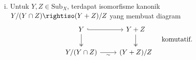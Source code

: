 \begin{teorema}
\begin{enumerate}[(i)]
		komutatif. Selain itu,
		$\overline{Y_1\cap Y_2}=\overline{Y_1}\cap\overline{Y_2}$ dan
		$\overline{Y_1+Y_2}=\overline{Y_1}+\overline{Y_2}$.
		\item Untuk $Y,Z\in\mathrm{Sub}_X$, terdapat isomorfisme kanonik
		$Y/(Y\cap Z)\rightiso(Y+Z)/Z$ yang membuat diagram
		\[\begin{tikzcd}
			Y \arrow[hookrightarrow, r] \arrow[twoheadrightarrow, d] & Y+Z \arrow[twoheadrightarrow, d] \\
			Y/(Y \cap Z) \arrow[r, "\sim"'] & (Y+Z)/Z
		\end{tikzcd} \quad \text{komutatif}. \]
	\end{enumerate}
\end{teorema}
